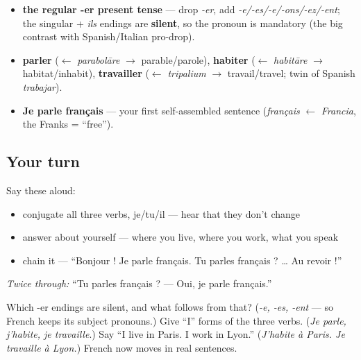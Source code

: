 \begin{grammarlens}[title={What you've built this chapter}]
\begin{itemize}
\raggedright
  \item \textbf{the regular -er present tense} — drop \emph{-er}, add \emph{-e/-es/-e/-ons/-ez/-ent}; the singular + \emph{ils} endings are \textbf{silent}, so the pronoun is mandatory (the big contrast with Spanish/Italian pro-drop).
  \item \textbf{parler} ($\leftarrow$ \emph{parabolāre} $\to$ parable/parole), \textbf{habiter} ($\leftarrow$ \emph{habitāre} $\to$ habitat/inhabit), \textbf{travailler} ($\leftarrow$ \emph{tripalium} $\to$ travail/travel; twin of Spanish \emph{trabajar}).
  \item \textbf{Je parle français} — your first self-assembled sentence (\emph{français} $\leftarrow$ \emph{Francia}, the Franks = \textquotedblleft{}free\textquotedblright{}).
\end{itemize}
\end{grammarlens}

\subsection*{Your turn}
Say these aloud:

\begin{itemize}
\raggedright
  \item conjugate all three verbs, je/tu/il — hear that they don't change
  \item answer about yourself — where you live, where you work, what you speak
  \item chain it — \textquotedblleft{}Bonjour ! Je parle français. Tu parles français ? … Au revoir !\textquotedblright{}
\end{itemize}

\emph{Twice through:} \textquotedblleft{}Tu parles français ? — Oui, je parle français.\textquotedblright{}

\begin{tcolorbox}[breakable,colback=teal!4,colframe=teal!35!black,title={Before you move on}]
Which -er endings are silent, and what follows from that? (\emph{-e, -es, -ent} — so French keeps its subject pronouns.) Give \textquotedblleft{}I\textquotedblright{} forms of the three verbs. (\emph{Je parle, j'habite, je travaille}.) Say \textquotedblleft{}I live in Paris. I work in Lyon.\textquotedblright{} (\emph{J'habite à Paris. Je travaille à Lyon.}) French now moves in real sentences.
\end{tcolorbox}
